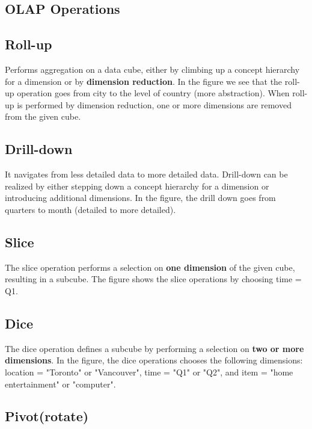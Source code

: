 	\subsection{OLAP Operations}

		\subsection*{Roll-up}

			Performs aggregation on a data cube, either by climbing up a concept hierarchy
			for a dimension or by {\bf dimension reduction}. In the figure we see that the roll-up
			operation goes from city to the level of country (more abstraction).
			When roll-up is performed by dimension reduction, one or more dimensions are 
			removed from the given cube. 

		\subsection*{Drill-down}

			It navigates from less detailed data to more detailed data. Drill-down can be 
			realized by either stepping down a concept hierarchy for a dimension or 
			introducing additional dimensions. In the figure, the drill down goes from 
			quarters to month (detailed to more detailed). 

		\subsection*{Slice}

			The slice operation performs a selection on {\bf one dimension} of the given 
			cube, resulting in a subcube. The figure shows the slice operations by
			choosing time = Q1. 

		\subsection*{Dice}

			The dice operation defines a subcube by performing a selection on {\bf two or more
			dimensions}. In the figure, the dice operations chooses the following dimensions:
			location = "Toronto" or "Vancouver", time = "Q1" or "Q2", and
			item = "home entertainment" or "computer". 

		\subsection*{Pivot(rotate)}

